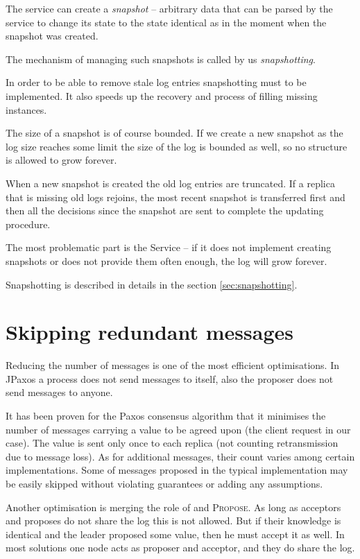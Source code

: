 The service can create a \textit{snapshot} -- arbitrary data that can be parsed by the service to change its state to the state identical as in the moment when the snapshot was created.

The mechanism of managing such snapshots is called by us \textit{snapshotting}.

In order to be able to remove stale log entries snapshotting must to be implemented. It also speeds up the recovery and process of filling missing instances.

The size of a snapshot is of course bounded. If we create a new snapshot as the log size reaches some limit the size of the log is bounded as well, so no structure is allowed to grow forever.

When a new snapshot is created the old log entries are truncated. If a replica that is missing old logs rejoins, the most recent snapshot is transferred first and then all the decisions since the snapshot are sent to complete the updating procedure.

The most problematic part is the Service -- if it does not implement creating snapshots or does not provide them often enough, the log will grow forever.

Snapshotting is described in details in the section \ref{sec:snapshotting}.

\section{Skipping redundant messages}
Reducing the number of messages is one of the most efficient optimisations. In JPaxos a process does not send messages to itself, also the proposer does not send \accept messages to anyone.

It has been proven for the Paxos consensus algorithm that it minimises the number of messages carrying a value to be agreed upon (the client request in our case). The value is sent only once to each replica (not counting retransmission due to message loss). As for additional messages, their count varies among certain implementations. Some of messages proposed in the typical implementation may be easily skipped without violating guarantees or adding any assumptions.


Another optimisation is merging the role of \accept and \textsc{Propose}. As long as acceptors and proposes do not share the log this is not allowed. But if their knowledge is identical and the leader proposed some value, then he must accept it as well. In most solutions one node acts as proposer and acceptor, and they do share the log.


